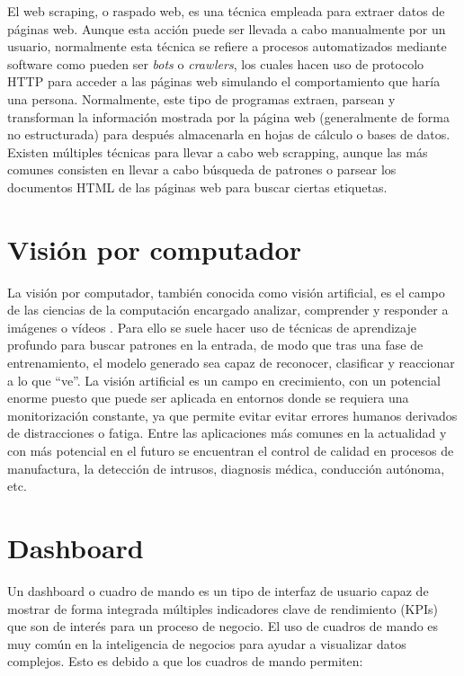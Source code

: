 El web scraping, o raspado web, es una técnica empleada para extraer datos de páginas web. Aunque esta acción puede ser llevada a cabo manualmente por un usuario, normalmente esta técnica se refiere a procesos automatizados mediante software como pueden ser \textit{bots} o \textit{crawlers}, los cuales hacen uso de protocolo HTTP para acceder a las páginas web simulando el comportamiento que haría una persona. Normalmente, este tipo de programas extraen, parsean y transforman la información mostrada por la página web (generalmente de forma no estructurada) para después almacenarla en hojas de cálculo o bases de datos. Existen múltiples técnicas para llevar a cabo web scrapping, aunque las más comunes consisten en llevar a cabo búsqueda de patrones o parsear los documentos HTML de las páginas web para buscar ciertas etiquetas.

\section{Visión por computador}

La visión por computador, también conocida como visión artificial, es el campo de las ciencias de la computación encargado analizar, comprender y responder a imágenes o vídeos \cite{insight_cv}. Para ello se suele hacer uso de técnicas de aprendizaje profundo para buscar patrones en la entrada, de modo que tras una fase de entrenamiento, el modelo generado sea capaz de reconocer, clasificar y reaccionar a lo que ``ve''. La visión artificial es un campo en crecimiento, con un potencial enorme puesto que puede ser aplicada en entornos donde se requiera una monitorización constante, ya que permite evitar evitar errores humanos derivados de distracciones o fatiga. Entre las aplicaciones más comunes en la actualidad y con más potencial en el futuro se encuentran el control de calidad en procesos de manufactura, la detección de intrusos, diagnosis médica, conducción autónoma, etc.

\section{Dashboard}

Un dashboard o cuadro de mando es un tipo de interfaz de usuario capaz de mostrar de forma integrada múltiples indicadores clave de rendimiento (KPIs) que son de interés para un proceso de negocio. El uso de cuadros de mando es muy común en la inteligencia de negocios para ayudar a visualizar datos complejos. Esto es debido a que los cuadros de mando permiten:

